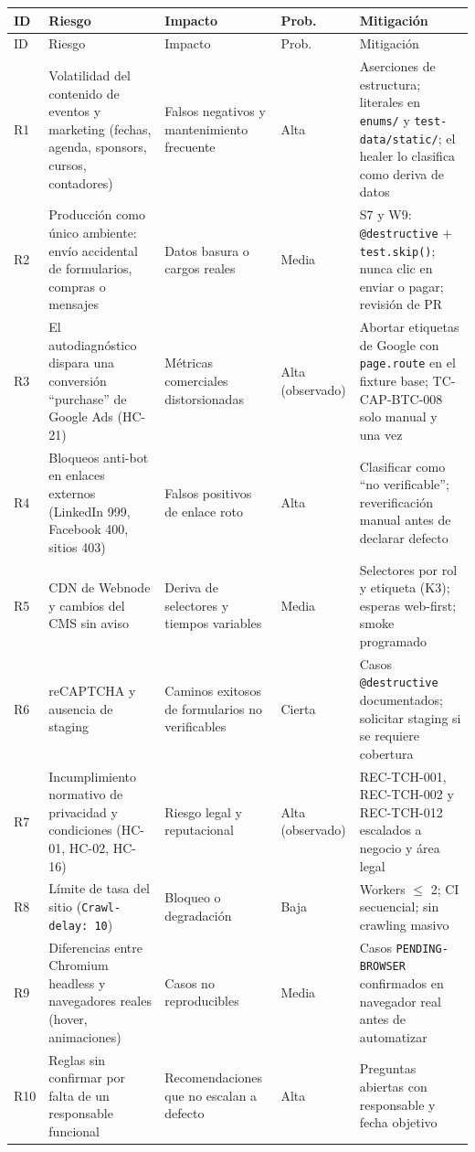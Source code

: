 \documentclass[11pt,a4paper]{article}
\begin{document}
{\footnotesize
\begin{xltabular}{\textwidth}{@{}l >{\raggedright\arraybackslash}p{0.24\textwidth} >{\raggedright\arraybackslash}p{0.16\textwidth} l X@{}}
\toprule
ID & Riesgo & Impacto & Prob. & Mitigación \\
\midrule
\endfirsthead
\toprule
ID & Riesgo & Impacto & Prob. & Mitigación \\
\midrule
\endhead
R1 & Volatilidad del contenido de eventos y marketing (fechas, agenda, sponsors, cursos, contadores) & Falsos negativos y mantenimiento frecuente & Alta & Aserciones de estructura; literales en \texttt{enums/} y \texttt{test-data/static/}; el healer lo clasifica como deriva de datos \\
R2 & Producción como único ambiente: envío accidental de formularios, compras o mensajes & Datos basura o cargos reales & Media & S7 y W9: \texttt{@destructive} + \texttt{test.skip()}; nunca clic en enviar o pagar; revisión de PR \\
R3 & El autodiagnóstico dispara una conversión ``purchase'' de Google Ads (HC-21) & Métricas comerciales distorsionadas & Alta (observado) & Abortar etiquetas de Google con \texttt{page.route} en el fixture base; TC-CAP-BTC-008 solo manual y una vez \\
R4 & Bloqueos anti-bot en enlaces externos (LinkedIn 999, Facebook 400, sitios 403) & Falsos positivos de enlace roto & Alta & Clasificar como ``no verificable''; reverificación manual antes de declarar defecto \\
R5 & CDN de Webnode y cambios del CMS sin aviso & Deriva de selectores y tiempos variables & Media & Selectores por rol y etiqueta (K3); esperas web-first; smoke programado \\
R6 & reCAPTCHA y ausencia de staging & Caminos exitosos de formularios no verificables & Cierta & Casos \texttt{@destructive} documentados; solicitar staging si se requiere cobertura \\
R7 & Incumplimiento normativo de privacidad y condiciones (HC-01, HC-02, HC-16) & Riesgo legal y reputacional & Alta (observado) & REC-TCH-001, REC-TCH-002 y REC-TCH-012 escalados a negocio y área legal \\
R8 & Límite de tasa del sitio (\texttt{Crawl-delay: 10}) & Bloqueo o degradación & Baja & Workers $\leq$ 2; CI secuencial; sin crawling masivo \\
R9 & Diferencias entre Chromium headless y navegadores reales (hover, animaciones) & Casos no reproducibles & Media & Casos \texttt{PENDING-BROWSER} confirmados en navegador real antes de automatizar \\
R10 & Reglas sin confirmar por falta de un responsable funcional & Recomendaciones que no escalan a defecto & Alta & Preguntas abiertas con responsable y fecha objetivo \\
\bottomrule
\end{xltabular}
}
\end{document}
